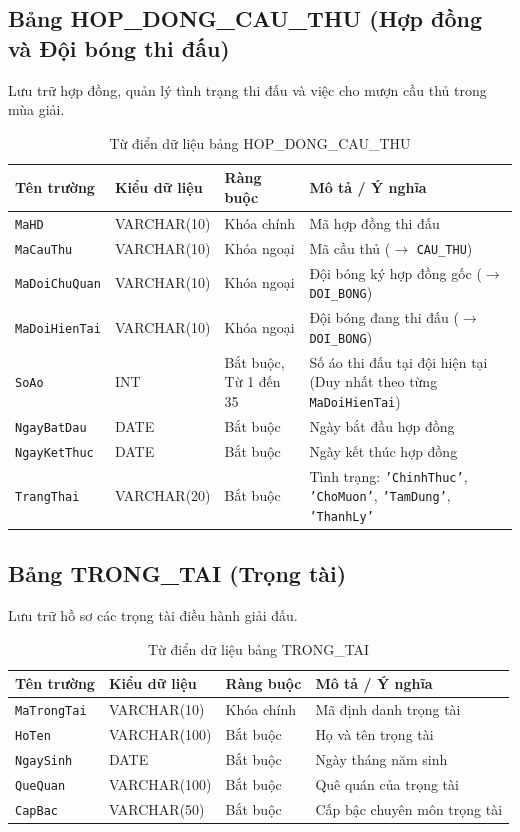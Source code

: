 \subsection{Bảng HOP\_DONG\_CAU\_THU (Hợp đồng và Đội bóng thi đấu)}
Lưu trữ hợp đồng, quản lý tình trạng thi đấu và việc cho mượn cầu thủ trong mùa giải.
\begin{table}[H]
\centering
\small
\begin{tabular}{|l|l|l|p{6cm}|}
\hline
\textbf{Tên trường} & \textbf{Kiểu dữ liệu} & \textbf{Ràng buộc} & \textbf{Mô tả / Ý nghĩa} \\ \hline
\texttt{MaHD} & VARCHAR(10) & Khóa chính & Mã hợp đồng thi đấu \\ \hline
\texttt{MaCauThu} & VARCHAR(10) & Khóa ngoại & Mã cầu thủ ($\rightarrow$ \texttt{CAU\_THU}) \\ \hline
\texttt{MaDoiChuQuan} & VARCHAR(10) & Khóa ngoại & Đội bóng ký hợp đồng gốc ($\rightarrow$ \texttt{DOI\_BONG}) \\ \hline
\texttt{MaDoiHienTai} & VARCHAR(10) & Khóa ngoại & Đội bóng đang thi đấu ($\rightarrow$ \texttt{DOI\_BONG}) \\ \hline
\texttt{SoAo} & INT & Bắt buộc, Từ 1 đến 35 & Số áo thi đấu tại đội hiện tại (Duy nhất theo từng \texttt{MaDoiHienTai}) \\ \hline
\texttt{NgayBatDau} & DATE & Bắt buộc & Ngày bắt đầu hợp đồng \\ \hline
\texttt{NgayKetThuc} & DATE & Bắt buộc & Ngày kết thúc hợp đồng \\ \hline
\texttt{TrangThai} & VARCHAR(20) & Bắt buộc & Tình trạng: \texttt{'ChinhThuc'}, \texttt{'ChoMuon'}, \texttt{'TamDung'}, \texttt{'ThanhLy'} \\ \hline
\end{tabular}
\caption{Từ điển dữ liệu bảng HOP\_DONG\_CAU\_THU}
\end{table}

\subsection{Bảng TRONG\_TAI (Trọng tài)}
Lưu trữ hồ sơ các trọng tài điều hành giải đấu.
\begin{table}[H]
\centering
\small
\begin{tabular}{|l|l|l|p{6cm}|}
\hline
\textbf{Tên trường} & \textbf{Kiểu dữ liệu} & \textbf{Ràng buộc} & \textbf{Mô tả / Ý nghĩa} \\ \hline
\texttt{MaTrongTai} & VARCHAR(10) & Khóa chính & Mã định danh trọng tài \\ \hline
\texttt{HoTen} & VARCHAR(100) & Bắt buộc & Họ và tên trọng tài \\ \hline
\texttt{NgaySinh} & DATE & Bắt buộc & Ngày tháng năm sinh \\ \hline
\texttt{QueQuan} & VARCHAR(100) & Bắt buộc & Quê quán của trọng tài \\ \hline
\texttt{CapBac} & VARCHAR(50) & Bắt buộc & Cấp bậc chuyên môn trọng tài \\ \hline
\end{tabular}
\caption{Từ điển dữ liệu bảng TRONG\_TAI}
\end{table}

